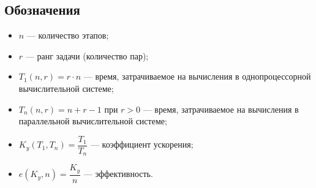 \subsection*{Обозначения}

\begin{itemize}
    \item $n$ --- количество этапов;
    \item $r$ --- ранг задачи (количество пар);
    \item $T_1(n, r) = r \cdot n$ --- время, затрачиваемое на вычисления в однопроцессорной вычислительной системе;
    \item $T_n(n, r) = n + r - 1$ при $r > 0$ --- время, затрачиваемое на вычисления в параллельной вычислительной системе;
    \item $K_y(T_1, T_n) = \dfrac{T_1}{T_n}$ --- коэффициент ускорения;
    \item $e(K_y, n) = \dfrac{K_y}{n}$ --- эффективность.
\end{itemize}
